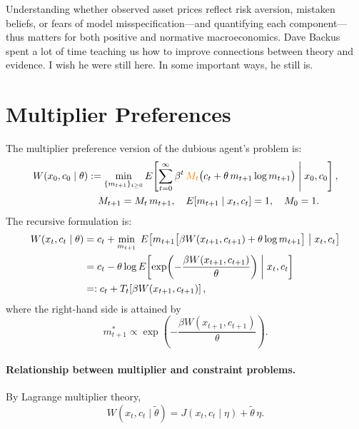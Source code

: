\documentclass[12pt]{article}
\theoremstyle{definition}
\begin{document}
Understanding whether observed asset prices reflect risk aversion,
mistaken beliefs, or fears of model misspecification---and quantifying
each component--- thus matters for both positive and normative
macroeconomics. Dave Backus spent a lot of time teaching us how to  improve connections  between theory and evidence. I wish he were still here. In some important ways, he still is.   

\appendix
\section{Multiplier Preferences}
\label{sec:multiplier}

The multiplier preference version of the dubious agent's problem is:
\begin{align}
W(x_0, c_0 \mid \theta) &:= \min_{\{m_{t+1}\}_{t\geq 0}}
    E\!\left[\sum_{t=0}^{\infty} \beta^t\,
    {\color{orange} M_t}\bigl(c_t + \theta\, m_{t+1}\log m_{t+1}\bigr)
    \;\middle|\; x_0, c_0\right], \label{eq:mult-seq}\\
&\quad M_{t+1} = M_t\, m_{t+1},\quad
    E[m_{t+1} \mid x_t, c_t] = 1,\quad M_0 = 1. \notag
\end{align}
The recursive formulation is:
\begin{align}
W(x_t, c_t \mid \theta) &= c_t + \min_{m_{t+1}}\;
    E\!\left[m_{t+1}\bigl[\beta W(x_{t+1}, c_{t+1})
    + \theta\log m_{t+1}\bigr] \;\middle|\; x_t, c_t\right] \notag\\
&= c_t - \theta\log E\!\left[\exp\!\left(
    -\frac{\beta W(x_{t+1}, c_{t+1})}{\theta}\right)
    \;\middle|\; x_t, c_t\right] \notag\\
&=: c_t + T_t\!\left[\beta W(x_{t+1}, c_{t+1})\right], \label{eq:mult-bellman}
\end{align}
where the right-hand side is attained by
\[
   m_{t+1}^* \propto \exp\!\left(
       -\frac{\beta W(x_{t+1}, c_{t+1})}{\theta}\right).
\]

\paragraph{Relationship between multiplier and constraint problems.}
By Lagrange multiplier theory,
\[
   W(x_t, c_t \mid \tilde\theta) = J(x_t, c_t \mid \eta)
       + \tilde\theta\, \eta.
\]




\end{document}
